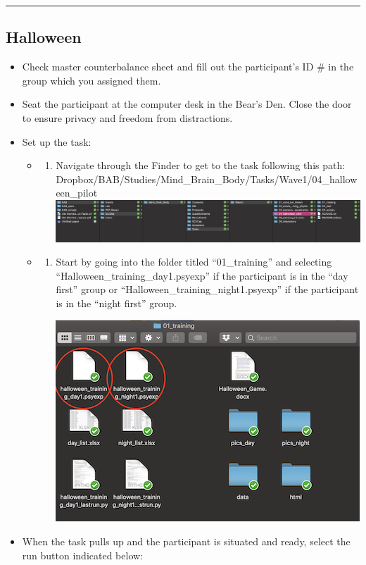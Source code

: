 \documentclass[]{book}
\providecommand{\tightlist}{%
  \setlength{\itemsep}{0pt}\setlength{\parskip}{0pt}}
\begin{document}
\begin{center}\rule{0.5\linewidth}{0.5pt}\end{center}

\hypertarget{halloween}{%
\subsection{Halloween}\label{halloween}}

\begin{itemize}
\item
  Check master counterbalance sheet and fill out the participant's ID \# in the group which you assigned them.
\item
  Seat the participant at the computer desk in the Bear's Den. Close the door to ensure privacy and freedom from distractions.
\item
  Set up the task:

  \begin{itemize}
  \item
    \begin{enumerate}
    \def\labelenumi{\alph{enumi}.}
    \tightlist
    \item
      Navigate through the Finder to get to the task following this path:
      Dropbox/BAB/Studies/Mind\_Brain\_Body/Tasks/Wave1/04\_halloween\_pilot
      \includegraphics{images/halloween/1.png}
    \end{enumerate}
  \item
    \begin{enumerate}
    \def\labelenumi{\alph{enumi}.}
    \setcounter{enumi}{1}
    \item
      Start by going into the folder titled ``01\_training'' and selecting ``Halloween\_training\_day1.psyexp'' if the participant is in the ``day first'' group or ``Halloween\_training\_night1.psyexp'' if the participant is in the ``night first'' group.

      \includegraphics{images/halloween/2.png}
    \end{enumerate}
  \end{itemize}
\item
  When the task pulls up and the participant is situated and ready, select the run button indicated below:


\end{itemize}
\end{document}
